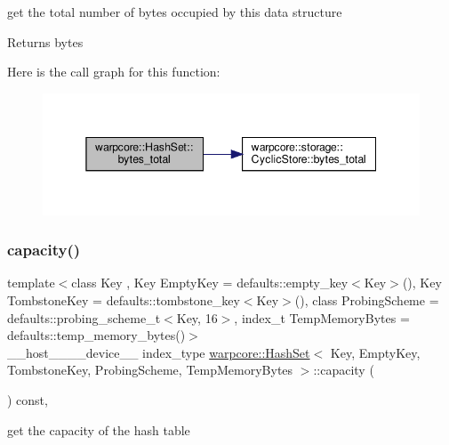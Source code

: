get the total number of bytes occupied by this data structure 

\begin{DoxyReturn}{Returns}
bytes 
\end{DoxyReturn}
Here is the call graph for this function\+:
\nopagebreak
\begin{figure}[H]
\begin{center}
\leavevmode
\includegraphics[width=345pt]{classwarpcore_1_1HashSet_a64aa9503fa5719a2d91bf9ecf2aa3cdc_cgraph}
\end{center}
\end{figure}
\mbox{\label{classwarpcore_1_1HashSet_a6edef2d260c214f294b61bb394a11545}} 
\subsubsection{\texorpdfstring{capacity()}{capacity()}}
{\footnotesize\ttfamily template$<$class Key , Key Empty\+Key = defaults\+::empty\+\_\+key$<$\+Key$>$(), Key Tombstone\+Key = defaults\+::tombstone\+\_\+key$<$\+Key$>$(), class Probing\+Scheme  = defaults\+::probing\+\_\+scheme\+\_\+t$<$\+Key, 16$>$, index\+\_\+t Temp\+Memory\+Bytes = defaults\+::temp\+\_\+memory\+\_\+bytes()$>$ \\
\+\_\+\+\_\+host\+\_\+\+\_\+\+\_\+\+\_\+device\+\_\+\+\_\+ index\+\_\+type \hyperlink{classwarpcore_1_1HashSet}{warpcore\+::\+Hash\+Set}$<$ Key, Empty\+Key, Tombstone\+Key, Probing\+Scheme, Temp\+Memory\+Bytes $>$\+::capacity (\begin{DoxyParamCaption}{ }\end{DoxyParamCaption}) const\hspace{0.3cm}{\ttfamily [inline]}, {\ttfamily [noexcept]}}



get the capacity of the hash table 

